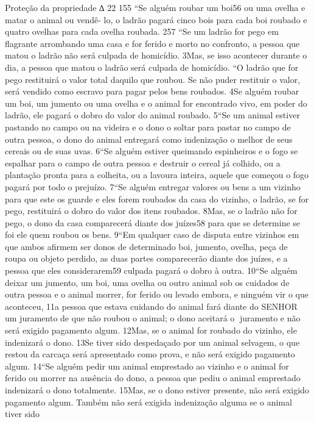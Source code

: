 Proteção da propriedade
∆   22 155
           “Se alguém roubar um boi56 ou uma ovelha e matar o animal ou vendê-
lo, o ladrão pagará cinco bois para cada boi roubado e quatro ovelhas para cada
ovelha roubada.
   257 “Se um ladrão for pego em flagrante arrombando uma casa e for ferido e
morto no confronto, a pessoa que matou o ladrão não será culpada de homicídio.
3Mas, se isso acontecer durante o dia, a pessoa que matou o ladrão será culpada
de homicídio.
   “O ladrão que for pego restituirá o valor total daquilo que roubou. Se não puder
restituir o valor, será vendido como escravo para pagar pelos bens roubados. 4Se
alguém roubar um boi, um jumento ou uma ovelha e o animal for encontrado
vivo, em poder do ladrão, ele pagará o dobro do valor do animal roubado.
   5“Se um animal estiver pastando no campo ou na videira e o dono o soltar para
pastar no campo de outra pessoa, o dono do animal entregará como indenização o
melhor de seus cereais ou de suas uvas.
   6“Se alguém estiver queimando espinheiros e o fogo se espalhar para o campo
de outra pessoa e destruir o cereal já colhido, ou a plantação pronta para a
colheita, ou a lavoura inteira, aquele que começou o fogo pagará por todo o
prejuízo.
   7“Se alguém entregar valores ou bens a um vizinho para que este os guarde e
eles forem roubados da casa do vizinho, o ladrão, se for pego, restituirá o dobro
do valor dos itens roubados. 8Mas, se o ladrão não for pego, o dono da casa
comparecerá diante dos juízes58 para que se determine se foi ele quem roubou os
bens.
   9“Em qualquer caso de disputa entre vizinhos em que ambos afirmem ser
donos de determinado boi, jumento, ovelha, peça de roupa ou objeto perdido, as
duas partes comparecerão diante dos juízes, e a pessoa que eles considerarem59
culpada pagará o dobro à outra.
   10“Se alguém deixar um jumento, um boi, uma ovelha ou outro animal sob os
cuidados de outra pessoa e o animal morrer, for ferido ou levado embora, e
ninguém vir o que aconteceu, 11a pessoa que estava cuidando do animal fará
diante do SENHOR um juramento de que não roubou o animal; o dono aceitará o
juramento e não será exigido pagamento algum. 12Mas, se o animal for roubado
do vizinho, ele indenizará o dono. 13Se tiver sido despedaçado por um animal
selvagem, o que restou da carcaça será apresentado como prova, e não será
exigido pagamento algum.
   14“Se alguém pedir um animal emprestado ao vizinho e o animal for ferido ou
morrer na ausência do dono, a pessoa que pediu o animal emprestado indenizará
o dono totalmente. 15Mas, se o dono estiver presente, não será exigido pagamento
algum. Também não será exigida indenização alguma se o animal tiver sido
